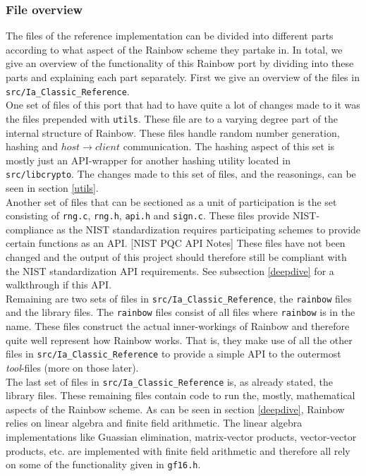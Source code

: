 \subsubsection{File overview}
The files of the reference implementation can be divided into different parts according to what aspect of the Rainbow scheme they partake in. In total, we give an overview of the functionality of this Rainbow port by dividing into these parts and explaining each part separately. First we give an overview of the files in \texttt{src/Ia\_Classic\_Reference}.
\medskip\\
One set of files of this port that had to have quite a lot of changes made to it was the files prepended with \texttt{utils}. These file are to a varying degree part of the internal structure of Rainbow. These files handle random number generation, hashing and $host\rightarrow client$ communication. The hashing aspect of this set is mostly just an API-wrapper for another hashing utility located in \texttt{src/libcrypto}. The changes made to this set of files, and the reasonings, can be seen in section \ref{utils}.
\medskip\\
Another set of files that can be sectioned as a unit of participation is the set consisting of \texttt{rng.c}, \texttt{rng.h}, \texttt{api.h} and \texttt{sign.c}. These files provide NIST-compliance as the NIST standardization requires participating schemes to provide certain functions as an API. [NIST PQC API Notes] These files have not been changed and the output of this project should therefore still be compliant with the NIST standardization API requirements. See subsection \ref{deepdive} for a walkthrough if this API.
\medskip\\
Remaining are two sets of files in \texttt{src/Ia\_Classic\_Reference}, the \texttt{rainbow} files and the library files. The \texttt{rainbow} files consist of all files where \texttt{rainbow} is in the name. These files construct the actual inner-workings of Rainbow and therefore quite well represent how Rainbow works. That is, they make use of all the other files in \texttt{src/Ia\_Classic\_Reference} to provide a simple API to the outermost \emph{tool}-files (more on those later).
\medskip\\
The last set of files in \texttt{src/Ia\_Classic\_Reference} is, as already stated, the library files. These remaining files contain code to run the, mostly, mathematical aspects of the Rainbow scheme. As can be seen in section \ref{deepdive}, Rainbow relies on linear algebra and finite field arithmetic. The linear algebra implementations like Guassian elimination, matrix-vector products, vector-vector products, etc. are implemented with finite field arithmetic and therefore all rely on some of the functionality given in \texttt{gf16.h}.
